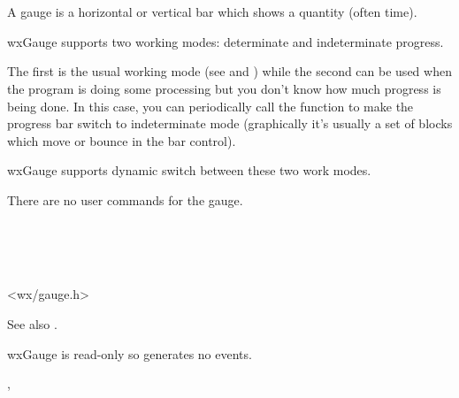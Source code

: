 \section{}\label{wxgauge}

A gauge is a horizontal or vertical bar which shows a quantity (often time).

wxGauge supports two working modes: determinate and indeterminate progress.

The first is the usual working mode (see 
and ) while the second can be used when
the program is doing some processing but you don't know how much progress is
being done.
In this case, you can periodically call the 
function to make the progress bar switch to indeterminate mode (graphically
it's usually a set of blocks which move or bounce in the bar control).

wxGauge supports dynamic switch between these two work modes.

There are no user commands for the gauge.


\\
\\
\\


<wx/gauge.h>


\twocolwidtha{5cm}
\begin{twocollist}\itemsep=0pt
\end{twocollist}

See also .


wxGauge is read-only so generates no events.


, 

